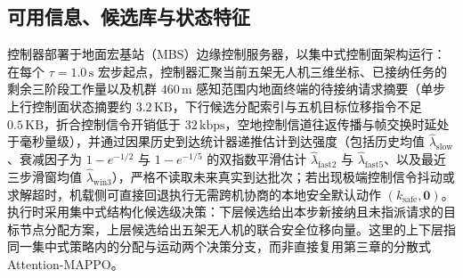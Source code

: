 \subsection{可用信息、候选库与状态特征}

控制器部署于地面宏基站（MBS）边缘控制服务器，以集中式控制面架构运行：在每个 $\tau=1.0\,\mathrm{s}$ 宏步起点，控制器汇聚当前五架无人机三维坐标、已接纳任务的剩余三阶段工作量以及机群 $460\,\mathrm{m}$ 感知范围内地面终端的待接纳请求摘要（单步上行控制面状态摘要约 $3.2\,\mathrm{KB}$，下行候选分配索引与五机目标位移指令不足 $0.5\,\mathrm{KB}$，折合控制信令开销低于 $32\,\mathrm{kbps}$，空地控制信道往返传播与帧交换时延处于毫秒量级），并通过因果历史到达统计器递推估计到达强度（包括历史均值 $\hat{\lambda}_{\mathrm{slow}}$、衰减因子为 $1-e^{-1/2}$ 与 $1-e^{-1/5}$ 的双指数平滑估计 $\hat{\lambda}_{\mathrm{fast2}}$ 与 $\hat{\lambda}_{\mathrm{fast5}}$、以及最近三步滑窗均值 $\hat{\lambda}_{\mathrm{win3}}$），严格不读取未来真实到达批次；若出现极端控制信令抖动或求解超时，机载侧可直接回退执行无需跨机协商的本地安全默认动作 $(k_{\mathrm{safe}},\mathbf{0})$。执行时采用集中式结构化候选级决策：下层候选给出本步新接纳且未指派请求的目标节点分配方案，上层候选给出五架无人机的联合安全位移向量。这里的上下层指同一集中式策略内的分配与运动两个决策分支，而非直接复用第三章的分散式 Attention-MAPPO。

